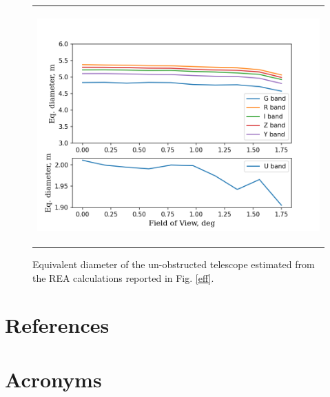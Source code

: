 \documentclass[SE,authoryear,toc]{lsstdoc}
\begin{document}
\begin{figure}
\begin{center}
\begin{tabular}{c}
\includegraphics[height=9cm]{Rubin_equivalent_diameter_TEA_cad}
\end{tabular}
\end{center}
\caption 
{ \label{eq_diameter} Equivalent diameter of the un-obstructed telescope estimated from the REA calculations reported in Fig. \ref{eff}.}
\end{figure} 




\clearpage


\appendix
\section{References} \label{sec:bib}
\renewcommand{\refname}{} %


\section{Acronyms} \label{sec:acronyms}

\end{document}
